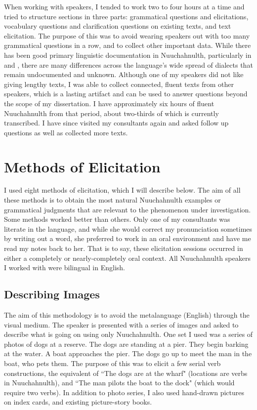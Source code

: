 When working with speakers, I tended to work two to four hours at a time and tried to structure sections in three parts: grammatical questions and elicitations, vocabulary questions and clarification questions on existing texts, and text elicitation. The purpose of this was to avoid wearing speakers out with too many grammatical questions in a row, and to collect other important data. While there has been good primary linguistic documentation in Nuuchahnulth, particularly in \cite{sapir1939} and \cite{rose1981}, there are many differences across the language's wide spread of dialects that remain undocumented and unknown. Although one of my speakers did not like giving lengthy texts, I was able to collect connected, fluent texts from other speakers, which is a lasting artifact and can be used to answer questions beyond the scope of my dissertation. I have approximately six hours of fluent Nuuchahnulth from that period, about two-thirds of which is currently transcribed. I have since visited my consultants again and asked follow up questions as well as collected more texts.

\section{Methods of Elicitation}

I used eight methods of elicitation, which I will describe below. The aim of all these methods is to obtain the most natural Nuuchahnulth examples or grammatical judgments that are relevant to the phenomenon under investigation. Some methods worked better than others. Only one of my consultants was literate in the language, and while she would correct my pronunciation sometimes by writing out a word, she preferred to work in an oral environment and have me read my notes back to her. That is to say, these elicitation sessions occurred in either a completely or nearly-completely oral context. All Nuuchahnulth speakers I worked with were bilingual in English.

\subsection{Describing Images}

The aim of this methodology is to avoid the metalanguage (English) through the visual medium. The speaker is presented with a series of images and asked to describe what is going on using only Nuuchahnulth. One set I used was a series of photos of dogs at a reserve. The dogs are standing at a pier. They begin barking at the water. A boat approaches the pier. The dogs go up to meet the man in the boat, who pets them. The purpose of this was to elicit a few serial verb constructions, the equivalent of ``The dogs are at the wharf" (locations are verbs in Nuuchahnulth), and ``The man pilots the boat to the dock" (which would require two verbs). In addition to photo series, I also used hand-drawn pictures on index cards, and existing picture-story books.

